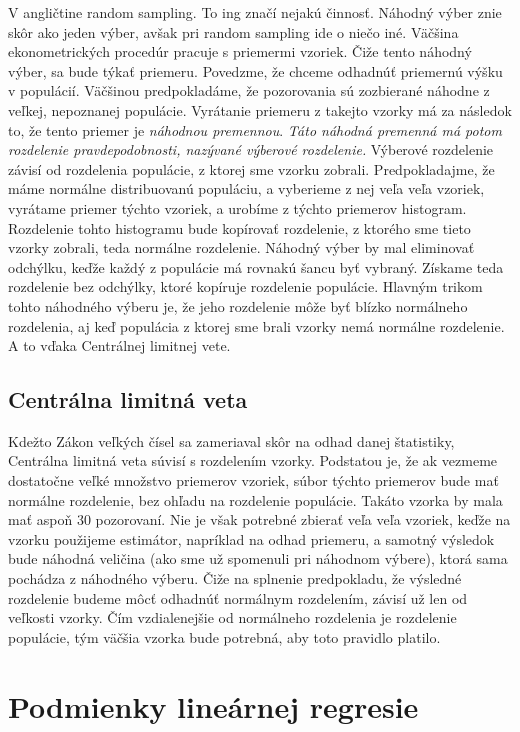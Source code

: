 \documentclass[]{article}
\begin{document}
V angličtine random sampling. To ing značí nejakú činnosť. Náhodný výber
znie skôr ako jeden výber, avšak pri random sampling ide o niečo iné.
Väčšina ekonometrických procedúr pracuje s priemermi vzoriek. Čiže tento
náhodný výber, sa bude týkať priemeru. Povedzme, že chceme odhadnúť
priemernú výšku v populácií. Väčšinou predpokladáme, že pozorovania sú
zozbierané náhodne z veľkej, nepoznanej populácie. Vyrátanie priemeru z
takejto vzorky má za následok to, že tento priemer je \emph{náhodnou
premennou}. \emph{Táto náhodná premenná má potom rozdelenie
pravdepodobnosti, nazývané výberové rozdelenie.} Výberové rozdelenie
závisí od rozdelenia populácie, z ktorej sme vzorku zobrali.
Predpokladajme, že máme normálne distribuovanú populáciu, a vyberieme z
nej veľa veľa vzoriek, vyrátame priemer týchto vzoriek, a urobíme z
týchto priemerov histogram. Rozdelenie tohto histogramu bude kopírovať
rozdelenie, z ktorého sme tieto vzorky zobrali, teda normálne
rozdelenie. Náhodný výber by mal eliminovať odchýlku, keďže každý z
populácie má rovnakú šancu byť vybraný. Získame teda rozdelenie bez
odchýlky, ktoré kopíruje rozdelenie populácie. Hlavným trikom tohto
náhodného výberu je, že jeho rozdelenie môže byť blízko normálneho
rozdelenia, aj keď populácia z ktorej sme brali vzorky nemá normálne
rozdelenie. A to vďaka Centrálnej limitnej vete.

\hypertarget{centruxe1lna-limitnuxe1-veta}{%
\subsection{Centrálna limitná veta}\label{centruxe1lna-limitnuxe1-veta}}

Kdežto Zákon veľkých čísel sa zameriaval skôr na odhad danej štatistiky,
Centrálna limitná veta súvisí s rozdelením vzorky. Podstatou je, že ak
vezmeme dostatočne veľké množstvo priemerov vzoriek, súbor týchto
priemerov bude mať normálne rozdelenie, bez ohľadu na rozdelenie
populácie. Takáto vzorka by mala mať aspoň 30 pozorovaní. Nie je však
potrebné zbierať veľa veľa vzoriek, keďže na vzorku použijeme estimátor,
napríklad na odhad priemeru, a samotný výsledok bude náhodná veličina
(ako sme už spomenuli pri náhodnom výbere), ktorá sama pochádza z
náhodného výberu. Čiže na splnenie predpokladu, že výsledné rozdelenie
budeme môcť odhadnúť normálnym rozdelením, závisí už len od veľkosti
vzorky. Čím vzdialenejšie od normálneho rozdelenia je rozdelenie
populácie, tým väčšia vzorka bude potrebná, aby toto pravidlo platilo.

\hypertarget{podmienky-lineuxe1rnej-regresie}{%
\section{Podmienky lineárnej
regresie}\label{podmienky-lineuxe1rnej-regresie}}
\end{document}

